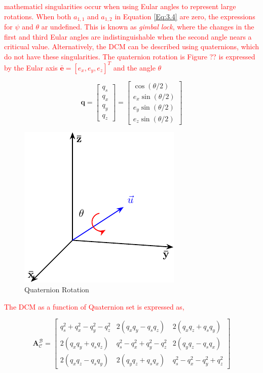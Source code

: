 \textcolor{red}{mathematicl singularities occur when using Eular angles to represent large rotations. When both $a_{1,1}$ and $a_{1,2}$ in Equation \ref{Eq:3.4} are zero, the expressions
for $\psi$ and $\theta$ ar undefined. This is known as \textit{gimbal lock}, where the changes in the first and third Eular angles are indistinguishable when the second angle nears
a criticual value. Alternatively, the DCM can be described using quaternions, which do not have these singularities. The quaternion rotation is Figure ?? is expressed by the Eular axis
$\mathbf{\bar{e}}=[e_x,e_y,e_z]^T$ and the angle $\theta$}

\begin{equation}
    \mathbf{q} = \begin{bmatrix} q_s \\ q_x \\ q_y \\ q_z \end{bmatrix}
    = \begin{bmatrix} \cos(\theta/2) \\ e_x\sin(\theta/2) \\ e_y\sin(\theta/2) \\ e_z\sin(\theta/2) \end{bmatrix}
\end{equation}

\begin{figure}[H]
    \centering
    \includegraphics[width=0.3\linewidth]{figures/Quaternion.pdf}
    \caption{Quaternion Rotation}
    \label{fig:3.2}
\end{figure}

\textcolor{red}{The DCM as a function of Quaternion set is expressed as,}

\begin{equation}
    \mathbf{A}_{\mathcal{C}}^{\mathcal{B}} = 
    \begin{bmatrix}
    q_s^2 + q_x^2 - q_y^2 - q_z^2 & 2(q_x q_y - q_s q_z) & 2(q_x q_z + q_s q_y) \\
    2(q_x q_y + q_s q_z) & q_s^2 - q_x^2 + q_y^2 - q_z^2 & 2(q_y q_z - q_s q_x) \\
    2(q_x q_z - q_s q_y) & 2(q_y q_z + q_s q_x) & q_s^2 - q_x^2 - q_y^2 + q_z^2   
    \end{bmatrix}
\end{equation}


